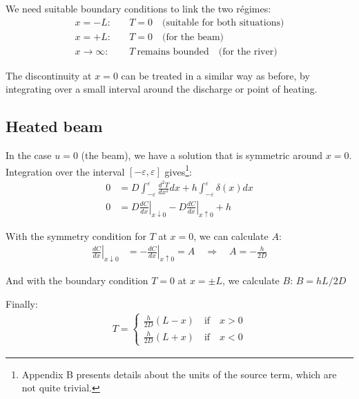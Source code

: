 \documentclass[onecolumn]{article}
\begin{document}
We need suitable boundary conditions to link the two r\'egimes:
%
\begin{align}
          x = -L: & \quad T = 0  \quad \text{(suitable for both situations)} \\
\nonumber x = +L: & \quad T = 0  \quad \text{(for the beam)} \\
\nonumber x \rightarrow \infty: & \quad T ~ \text{remains~bounded}  \quad \text{(for the river)}
\end{align}

The discontinuity at $x = 0$ can be treated in a similar way as before, by integrating over a small interval
around the discharge or point of heating.

\subsection*{Heated beam}
In the case $u = 0$ (the beam), we have a solution that is
symmetric around $x = 0$. Integration over the interval $[-\varepsilon,\varepsilon]$ gives\footnote{Appendix B presents details about the units of the source term, which are not quite trivial.}:
%
\begin{align}
\label{integralDelta}
          0 & =
              D \int_{-\varepsilon}^{\varepsilon} \frac{d^2 T}{d x^2} dx + h \int_{-\varepsilon}^{\varepsilon} \delta(x) dx \\
\nonumber 0 & =
              \left. D \frac{dC}{dx}\right|_{x\downarrow 0} - \left. D \frac{dC}{dx}\right|_{x\uparrow 0} + h
\end{align}

With the symmetry condition for $T$ at $x = 0$, we can calculate $A$:
%
\begin{align}
\left. \frac{dC}{dx}\right|_{x\downarrow 0} & = - \left. \frac{dC}{dx}\right|_{x\uparrow 0} =  A \quad  \Rightarrow \quad
A = -\frac{h}{2D}
\end{align}

And with the boundary condition $T = 0$ at $x = \pm L$, we calculate $B$: $B = hL/2D$

Finally:
%
\begin{align}
          T =
          \begin{cases}
          \frac{h}{2D} (L - x) \quad \text{if} \quad x > 0 \\
\nonumber \frac{h}{2D} (L + x) \quad \text{if} \quad x < 0
          \end{cases}
\end{align}
\end{document}

